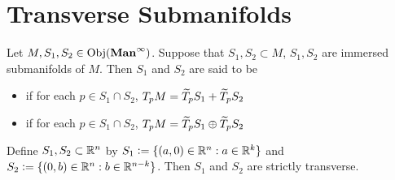 \documentclass{book}
\begin{document}
	\newpage

	\section{Transverse Submanifolds}

	\begin{defn} 
		Let $M, S_1, S_2 \in \operatorname{Obj}(\operatorname*{\text{\textbf{Man}}^{\infty}})$. Suppose that $S_1, S_2 \subset M$, $S_1, S_2$ are immersed submanifolds of $M$. Then $S_1$ and $S_2$ are said to be 
		\begin{itemize}
			\item {} if for each $p \in S_1 \cap S_2$, $T_pM = \widetilde{T}_p S_1 + \widetilde{T}_p S_2$
			\item {} if for each $p \in S_1 \cap S_2$, $T_pM = \widetilde{T}_p S_1 \oplus \widetilde{T}_p S_2$ 
		\end{itemize} 
	\end{defn}

	\begin{ex} 
		Define $S_1, S_2 \subset \mathbb{R}^n$ by $S_1 \vcentcolon= \{(a,0) \in \mathbb{R}^n: a \in \mathbb{R}^k\}$ and $S_2 \vcentcolon= \{(0,b) \in \mathbb{R}^n: b \in \mathbb{R}^{n-k}\}$. Then $S_1$ and $S_2$ are strictly transverse.
	\end{ex}
	
\end{document}
